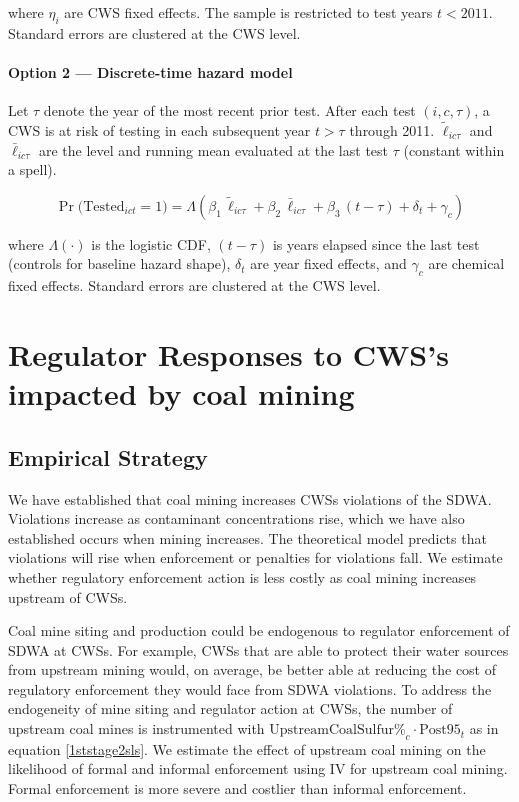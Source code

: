 \documentclass{article}
\begin{document}
\noindent where $\eta_i$ are CWS fixed effects.
The sample is restricted to test years $t < 2011$.
Standard errors are clustered at the CWS level.

\paragraph*{Option 2 --- Discrete-time hazard model}

Let $\tau$ denote the year of the most recent prior test.
After each test $(i,c,\tau)$, a CWS is at risk of testing in each
subsequent year $t > \tau$ through 2011.
$\widetilde{\ell}_{ic\tau}$ and $\bar{\ell}_{ic\tau}$ are the level and
running mean evaluated at the last test $\tau$ (constant within a spell).

\begin{equation}
  \Pr\!\bigl(\text{Tested}_{ict} = 1\bigr)
    = \Lambda\!\left(
        \beta_1\,\widetilde{\ell}_{ic\tau}
      + \beta_2\,\bar{\ell}_{ic\tau}
      + \beta_3\,(t - \tau)
      + \delta_t + \gamma_c
      \right)
  \label{eq:hazard}
\end{equation}

\noindent where $\Lambda(\cdot)$ is the logistic CDF,
$(t-\tau)$ is years elapsed since the last test (controls for
baseline hazard shape), $\delta_t$ are year fixed effects,
and $\gamma_c$ are chemical fixed effects.
Standard errors are clustered at the CWS level.




\section{Regulator Responses to CWS's impacted by coal mining}

\subsection{Empirical Strategy}

We have established that coal mining increases CWSs violations of the SDWA. Violations increase as contaminant concentrations rise, which we have also established occurs when mining increases. The theoretical model predicts that violations will rise when enforcement or penalties for violations fall. We estimate whether regulatory enforcement action is less costly as coal mining increases upstream of CWSs. 

Coal mine siting and production could be endogenous to regulator enforcement of SDWA at CWSs. For example, CWSs that are able to protect their water sources from upstream mining would, on average, be better able at reducing the cost of regulatory enforcement they would face from SDWA violations. To address the endogeneity of mine siting and regulator action at CWSs, the number of upstream coal mines is instrumented with $\text{UpstreamCoalSulfur\%}_c \cdot \text{Post95}_t$ as in equation \ref{1ststage2sls}. We estimate the effect of upstream coal mining on the likelihood of formal and informal enforcement using IV for upstream coal mining. Formal enforcement is more severe and costlier than informal enforcement. 
\end{document}
